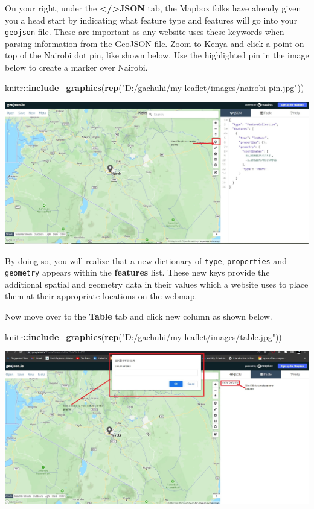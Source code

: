 \documentclass[
]{book}
\newenvironment{Shaded}{\begin{snugshade}}{\end{snugshade}}
\newcommand{\FunctionTok}[1]{\textcolor[rgb]{0.13,0.29,0.53}{\textbf{#1}}}
\newcommand{\NormalTok}[1]{#1}
\newcommand{\SpecialCharTok}[1]{\textcolor[rgb]{0.81,0.36,0.00}{\textbf{#1}}}
\newcommand{\StringTok}[1]{\textcolor[rgb]{0.31,0.60,0.02}{#1}}
\begin{document}
On your right, under the \textbf{\textless/\textgreater JSON} tab, the Mapbox folks have already given you a head start by indicating what feature type and features will go into your \texttt{geojson} file. These are important as any website uses these keywords when parsing information from the GeoJSON file. Zoom to Kenya and click a point on top of the Nairobi dot pin, like shown below. Use the highlighted pin in the image below to create a marker over Nairobi.

\begin{Shaded}
\begin{Highlighting}[]
\NormalTok{knitr}\SpecialCharTok{::}\FunctionTok{include\_graphics}\NormalTok{(}\FunctionTok{rep}\NormalTok{(}\StringTok{"D:/gachuhi/my{-}leaflet/images/nairobi{-}pin.jpg"}\NormalTok{))}
\end{Highlighting}
\end{Shaded}

\includegraphics{../images/nairobi-pin.jpg}

By doing so, you will realize that a new dictionary of \texttt{type}, \texttt{properties} and \texttt{geometry} appears within the \textbf{features} list. These new keys provide the additional spatial and geometry data in their values which a website uses to place them at their appropriate locations on the webmap.

Now move over to the \textbf{Table} tab and click new column as shown below.

\begin{Shaded}
\begin{Highlighting}[]
\NormalTok{knitr}\SpecialCharTok{::}\FunctionTok{include\_graphics}\NormalTok{(}\FunctionTok{rep}\NormalTok{(}\StringTok{"D:/gachuhi/my{-}leaflet/images/table.jpg"}\NormalTok{))}
\end{Highlighting}
\end{Shaded}

\includegraphics{../images/table.jpg}
\end{document}
